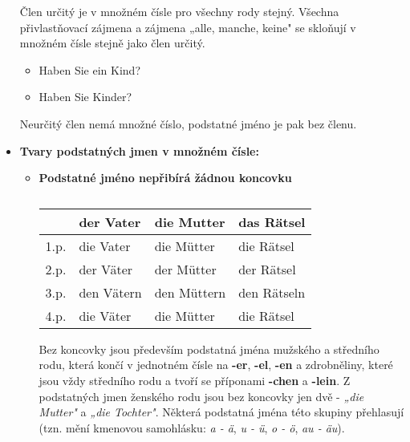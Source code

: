\begin{itemize}
              Člen určitý je v množném čísle pro všechny rody stejný. Všechna přivlastňovací 
              zájmena a zájmena „alle, manche, keine" se skloňují v množném čísle stejně jako člen 
              určitý.
              \begin{itemize}
                \addtolength{\itemindent}{5em}
                \item Haben Sie ein Kind?
                \item Haben Sie Kinder?
              \end{itemize}
              Neurčitý člen nemá množné číslo, podstatné jméno je pak bez členu.
        \item \textbf{Tvary podstatných jmen v množném čísle:}
          \begin{itemize}
            \item \textbf{Podstatné jméno nepřibírá žádnou koncovku}
              \begin{table}[ht!]   %
                \hspace*{4em}
                \begin{tabular}{l|lll}
                       & \textbf{der Vater}  & \textbf{die Mutter}  & \textbf{das Rätsel}  \\
                  \hline
                  1.p. & die Vater           & die Mütter           & die Rätsel           \\
                  2.p. & der Väter           & der Mütter           & der Rätsel           \\
                  3.p. & den Vätern          & den Müttern          & den Rätseln          \\
                  4.p. & die Väter           & die Mütter           & die Rätsel           \\
                  \hline
                \end{tabular}
                \caption*{ }
              \end{table}
        
              Bez koncovky jsou především podstatná jména mužského a středního rodu, která končí v 
              jednotném čísle na \textbf{-er}, \textbf{-el}, \textbf{-en} a zdrobněliny, které jsou 
              vždy středního rodu a tvoří se příponami \textbf{-chen} a \textbf{-lein}. Z 
              podstatných jmen ženského rodu jsou bez koncovky jen dvě - \emph{„die Mutter"} a 
              \emph{„die Tochter"}. Některá podstatná jména této skupiny přehlasují (tzn. mění 
              kmenovou samohlásku: \emph{a - ä}, \emph{u - ü}, \emph{o - ö}, \emph{au - äu}).
      

\end{itemize}
\end{itemize}
